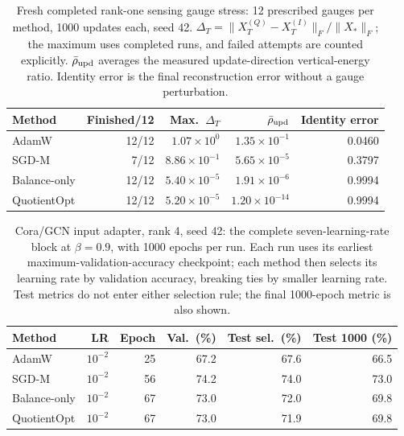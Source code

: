 \begin{table}[t]
\centering\small
\caption{Fresh completed rank-one sensing gauge stress: 12 prescribed gauges per method, 1000 updates each, seed 42. $\Delta_T=\|X_T^{(Q)}-X_T^{(I)}\|_F/\|X_*\|_F$; the maximum uses completed runs, and failed attempts are counted explicitly. $\bar\rho_{\rm upd}$ averages the measured update-direction vertical-energy ratio. Identity error is the final reconstruction error without a gauge perturbation.}
\label{tab:fresh-gauge}
\setlength{\tabcolsep}{4pt}
\begin{tabular}{lrrrr}
\toprule Method & Finished/12 & Max.\ $\Delta_T$ & $\bar\rho_{\rm upd}$ & Identity error\\\midrule
AdamW & 12/12 & $1.07\!\times\!10^{0}$ & $1.35\!\times\!10^{-1}$ & 0.0460\\
SGD-M & 7/12 & $8.86\!\times\!10^{-1}$ & $5.65\!\times\!10^{-5}$ & 0.3797\\
Balance-only & 12/12 & $5.40\!\times\!10^{-5}$ & $1.91\!\times\!10^{-6}$ & 0.9994\\
\rowcolor{oursbg}QuotientOpt & 12/12 & $5.20\!\times\!10^{-5}$ & $1.20\!\times\!10^{-14}$ & 0.9994\\
\bottomrule
\end{tabular}
\end{table}
\begin{table}[t]
\centering\small
\caption{Cora/GCN input adapter, rank 4, seed 42: the complete seven-learning-rate block at $\beta=0.9$, with 1000 epochs per run. Each run uses its earliest maximum-validation-accuracy checkpoint; each method then selects its learning rate by validation accuracy, breaking ties by smaller learning rate. Test metrics do not enter either selection rule; the final 1000-epoch metric is also shown.}
\label{tab:fresh-cora}
\setlength{\tabcolsep}{4pt}
\begin{tabular}{lrrrrr}
\toprule Method & LR & Epoch & Val.\ (\%) & Test sel.\ (\%) & Test 1000 (\%)\\\midrule
AdamW & $10^{-2}$ & 25 & 67.2 & 67.6 & 66.5\\
SGD-M & $10^{-2}$ & 56 & 74.2 & 74.0 & 73.0\\
Balance-only & $10^{-2}$ & 67 & 73.0 & 72.0 & 69.8\\
\rowcolor{oursbg}QuotientOpt & $10^{-2}$ & 67 & 73.0 & 71.9 & 69.8\\
\bottomrule
\end{tabular}
\end{table}
